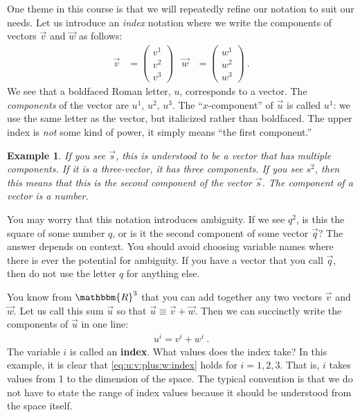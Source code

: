 \documentclass[12pt]{article}
\newtheorem{example}{Example}[section]
\begin{document}
One theme in this course is that we will repeatedly refine our notation to suit our needs. Let us introduce an \emph{index} notation where we write the components of vectors $\vec{v}$ and $\vec{w}$ as follows:
\begin{align}
    \vec{v}
    &=
    \begin{pmatrix}
        v^1 \\ v^2 \\ v^3
    \end{pmatrix}
    &
    \vec{w}
    &=
    \begin{pmatrix}
        w^1 \\ w^2 \\ w^3
    \end{pmatrix} \ .
\end{align}
We see that a boldfaced Roman letter, $u$, corresponds to a vector. The \emph{components} of the vector are $u^1$, $u^2$, $u^3$. The ``$x$-component'' of $\vec{u}$ is called $u^1$: we use the same letter as the vector, but italicized rather than boldfaced. The upper index is \emph{not} some kind of power, it simply means ``the first component.'' 

\begin{example}
If you see $\vec{s}$, this is understood to be a vector that has multiple components. If it is a three-vector, it has three components. If you see $s^2$, then this means that this is the \emph{second component} of the vector $\vec{s}$. The component of a vector is a number. 
\end{example}

You may worry that this notation introduces ambiguity. If we see $q^2$, is this the square of some number $q$, or is it the second component of some vector $\vec{q}$? The answer depends on context. You should avoid choosing variable names where there is ever the potential for ambiguity. If you have a vector that you call $\vec{q}$, then do not use the letter $q$ for anything else.



You know from $\mathbbm{R}^3$ that you can add together any two vectors $\vec{v}$ and $\vec{w}$.
% 
Let us call this sum $\vec{u}$ so that $\vec{u}\equiv \vec{v}+\vec{w}$. Then we can succinctly write the components of $\vec{u}$ in one line:
\begin{align}
    u^i = v^i + w^i \ .
    \label{eq:u:v:plus:w:index}
\end{align}
The variable $i$ is called an \textbf{index}. What values does the index take? In this example, it is 
clear that \eqref{eq:u:v:plus:w:index} holds for $i=1,2,3$. That is, $i$ takes values from 1 to the dimension of the space. The typical convention is that we do not have to state the range of index values because it should be understood from the space itself. 
\end{document}
